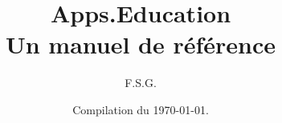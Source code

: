 \documentclass[a4paper, 12pt]{book}
\title{Apps.Education\\Un manuel de référence}
\author{F.S.G.}
\date{Compilation du \today{}.}
\renewcommand{\baselinestretch}{1.25}
\begin{document}
\begin{titlepage}
    \maketitle
\end{titlepage}




















%
%
%
\newpage
\renewcommand{\baselinestretch}{1}
\setlength{\parskip}{0em}
\tableofcontents
\listoffigures




\end{document}
